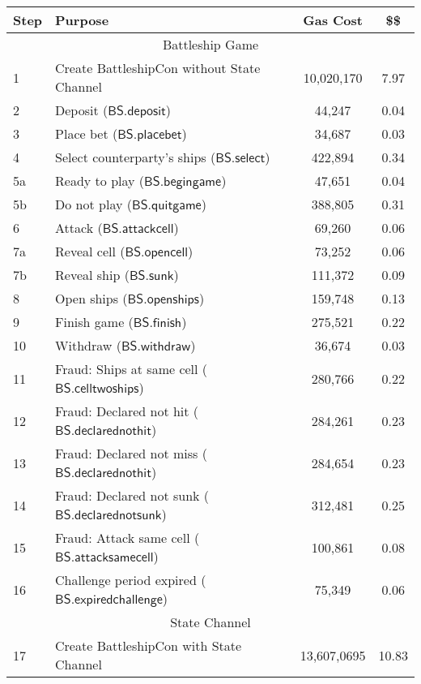 \documentclass{llncs}
\newcommand{\battleshipattackcell}{\mathsf{BS.attackcell}}
\newcommand{\battleshipbegin}{\mathsf{BS.begingame}}
\newcommand{\battleshipquit}{\mathsf{BS.quitgame}}
\newcommand{\battleshipplacebet}{\mathsf{BS.placebet}}
\newcommand{\battleshipselectboard}{\mathsf{BS.select}}
\newcommand{\battleshiprevealcell}{\mathsf{BS.opencell}}
\newcommand{\battleshipsinking}{\mathsf{BS.sunk}}
\newcommand{\battleshiprevealboard}{\mathsf{BS.openships}}
\newcommand{\battleshipdeposit}{\mathsf{BS.deposit}}
\newcommand{\battleshipwithdraw}{\mathsf{BS.withdraw}}
\newcommand{\battleshipfinish}{\mathsf{BS.finish}}
\newcommand{\battleshipdeclarednotsunk}{\mathsf{BS.declarednotsunk}}
\newcommand{\battleshipdeclarednothit}{\mathsf{BS.declarednothit}}
\newcommand{\battleshipsamecell}{\mathsf{BS.attacksamecell}}
\newcommand{\battleshiptwoships}{\mathsf{BS.celltwoships}}
\newcommand{\battleshipchallengeexpired}{\mathsf{BS.expiredchallenge}}
\begin{document}
	
	
	\appendix
	
	\begin{table}
		\centering
		\begin{tabular}[]{l l c c}
			
			\textbf{Step} & \textbf{Purpose} & \textbf{Gas Cost} & \textbf{\$\$}  \\ 
			\hline
			\multicolumn{4}{c}{Battleship Game} \\
			\hline
			1 & Create BattleshipCon without State Channel & 10,020,170 & 7.97 \\
			2 & Deposit ($\battleshipdeposit$) & 44,247 & 0.04 \\
			3 & Place bet ($\battleshipplacebet$)& 34,687 & 0.03 \\
			4 & Select counterparty's ships ($\battleshipselectboard$) & 422,894 & 0.34 \\ 
			5a & Ready to play ($\battleshipbegin$) & 47,651 & 0.04 \\
			5b & Do not play ($\battleshipquit$) & 388,805 & 0.31 \\
			6 & Attack ($\battleshipattackcell$) & 69,260 & 0.06 \\
			7a & Reveal cell ($\battleshiprevealcell$) & 73,252 & 0.06 \\
			7b & Reveal ship ($\battleshipsinking$)& 111,372 & 0.09  \\
			8 & Open ships ($\battleshiprevealboard$) & 159,748 & 0.13 \\
			9 & Finish game ($\battleshipfinish$) & 275,521 & 0.22 \\
			10 & Withdraw ($\battleshipwithdraw$) & 36,674 & 0.03 \\ 
			11 & Fraud: Ships at same cell ($\battleshiptwoships$) & 280,766 & 0.22\\
			12 & Fraud: Declared not hit ($\battleshipdeclarednothit$) & 284,261 & 0.23 \\
			13 & Fraud: Declared not miss ($\battleshipdeclarednothit$) & 284,654 & 0.23 \\
			14 & Fraud: Declared not sunk ($\battleshipdeclarednotsunk$) & 312,481 & 0.25 \\
			15 & Fraud: Attack same cell ($\battleshipsamecell$) & 100,861 & 0.08 \\
			16 & Challenge period expired ($\battleshipchallengeexpired$) &75,349 & 0.06 \\
			\hline
			\multicolumn{4}{c}{State Channel} \\
			\hline
			17 & Create BattleshipCon with State Channel & 13,607,0695 & 10.83 \\

\end{tabular}
\end{table}
\end{document}
